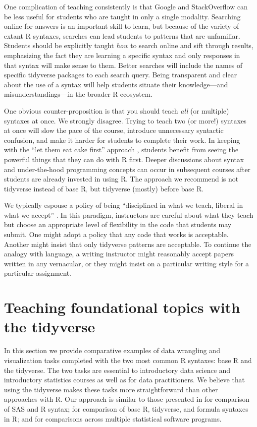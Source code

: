 \documentclass[12pt]{article}
\begin{document}
One complication of teaching consistently is that Google and
StackOverflow can be less useful for students who are taught in only a
single modality. Searching online for answers is an important skill to
learn, but because of the variety of extant R syntaxes, searches can
lead students to patterns that are unfamiliar. Students should be
explicitly taught \emph{how} to search online and sift through results,
emphasizing the fact they are learning a specific syntax and only
responses in that syntax will make sense to them. Better searches will
include the names of specific tidyverse packages to each search query.
Being transparent and clear about the use of a syntax will help students
situate their knowledge---and misunderstandings---in the broader R
ecosystem.

One obvious counter-proposition is that you should teach \emph{all} (or
multiple) syntaxes at once. We strongly disagree. Trying to teach two
(or more!) syntaxes at once will slow the pace of the course, introduce
unnecessary syntactic confusion, and make it harder for students to
complete their work. In keeping with the ``let them eat cake first''
approach \citep{cetinkaya2020fresh, wang2017}, students benefit from
seeing the powerful things that they can do with R first. Deeper
discussions about syntax and under-the-hood programming concepts can
occur in subsequent courses after students are already invested in using
R. The approach we recommend is not tidyverse instead of base R, but
tidyverse (mostly) before base R.

We typically espouse a policy of being ``disciplined in what we teach,
liberal in what we accept'' \citep{postel1980dod}. In this paradigm,
instructors are careful about what they teach but choose an appropriate
level of flexibility in the code that students may submit. One might
adopt a policy that any code that works is acceptable. Another might
insist that only tidyverse patterns are acceptable. To continue the
analogy with language, a writing instructor might reasonably accept
papers written in any vernacular, or they might insist on a particular
writing style for a particular assignment.

\hypertarget{sec:tidyverse}{%
\section{Teaching foundational topics with the
tidyverse}\label{sec:tidyverse}}

In this section we provide comparative examples of data wrangling and
visualization tasks completed with the two most common R syntaxes: base
R and the tidyverse. The two tasks are essential to introductory data
science and introductory statistics courses as well as for data
practitioners. We believe that using the tidyverse makes these tasks
more straightforward than other approaches with R. Our approach is
similar to those presented in \citet{kleinman2009sas} for comparison of
SAS and R syntax; \citet{mcnamaraamelia2021} for comparison of base R,
tidyverse, and formula syntaxes in R; and \citet{dierker2021} for
comparisons across multiple statistical software programs.
\end{document}

